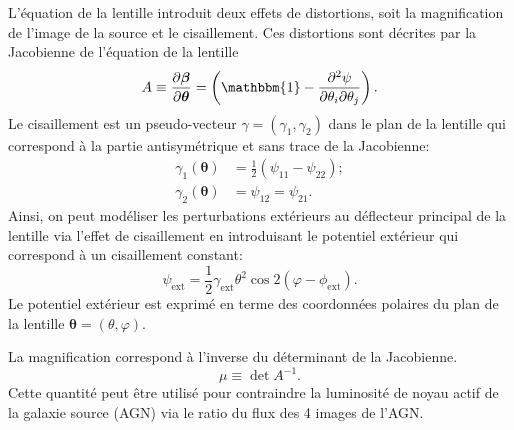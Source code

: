 \documentclass[times,10pt,twocolumn]{article}
\begin{document}
L'équation de la lentille introduit deux effets de distortions, soit la magnification de l'image 
de la source et le cisaillement. Ces distortions sont décrites par la Jacobienne de 
l'équation de la lentille
\begin{equation}\label{eq:Jacobian} 
        A \equiv \frac{\partial \boldsymbol{\beta}}{\partial \boldsymbol{\theta}}
= \left( \mathbbm{1} - \frac{\partial^2 \psi}{\partial \theta_i \partial \theta_j} \right). 
\end{equation} 
Le cisaillement est un pseudo-vecteur $\gamma = (\gamma_1, \gamma_2)$ dans le plan de la lentille 
qui correspond à la partie antisymétrique et sans trace de la Jacobienne:
\begin{align}
        \gamma_1(\boldsymbol{\theta}) &=  \frac{1}{2} \left( \psi_{11} - \psi_{22} \right); \\
        \gamma_2(\boldsymbol{\theta}) &= \psi_{12} = \psi_{21}.
\end{align}
Ainsi, on peut modéliser les perturbations extérieurs au déflecteur principal de la lentille 
via l'effet de cisaillement en introduisant le potentiel extérieur qui correspond à un 
cisaillement constant:
\begin{equation}\label{eq:gamma_ext} 
        \psi_{\mathrm{ext}}  = \frac{1}{2} \gamma_{\mathrm{ext}} \theta^2 
        \cos 2(\varphi - \phi_{\mathrm{ext}}).
\end{equation} 
Le potentiel extérieur est exprimé en terme des coordonnées polaires du plan de la lentille 
$\boldsymbol{\theta} = (\theta, \varphi)$.

La magnification correspond à l'inverse du déterminant de la Jacobienne. 
\begin{equation}\label{eq:Magnification} 
        \mu \equiv \det{A}^{-1}.
\end{equation} 
Cette quantité peut être utilisé pour contraindre la luminosité de noyau actif de la galaxie 
source (AGN) via le ratio du flux des 4 images de l'AGN.
\end{document}
